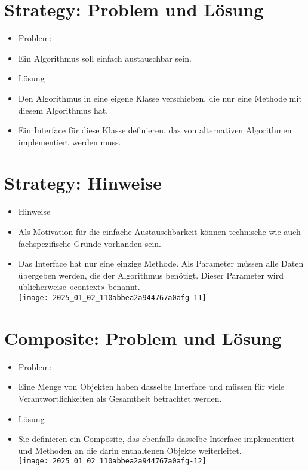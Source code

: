 \documentclass[10pt]{article}
\begin{document}
\section*{Strategy: Problem und Lösung}
\begin{itemize}
  \item Problem:
  \item Ein Algorithmus soll einfach austauschbar sein.
  \item Lösung
  \item Den Algorithmus in eine eigene Klasse verschieben, die nur eine Methode mit diesem Algorithmus hat.
  \item Ein Interface für diese Klasse definieren, das von alternativen Algorithmen implementiert werden muss.
\end{itemize}

\section*{Strategy: Hinweise}
\begin{itemize}
  \item Hinweise
  \item Als Motivation für die einfache Austauschbarkeit können technische wie auch fachspezifische Gründe vorhanden sein.
  \item Das Interface hat nur eine einzige Methode. Als Parameter müssen alle Daten übergeben werden, die der Algorithmus benötigt. Dieser Parameter wird üblicherweise «context» benannt.\\
\texttt{[image: 2025\_01\_02\_110abbea2a944767a0afg-11]}
\end{itemize}

\section*{Composite: Problem und Lösung}
\begin{itemize}
  \item Problem:
  \item Eine Menge von Objekten haben dasselbe Interface und müssen für viele Verantwortlichkeiten als Gesamtheit betrachtet werden.
  \item Lösung
  \item Sie definieren ein Composite, das ebenfalls dasselbe Interface implementiert und Methoden an die darin enthaltenen Objekte weiterleitet.\\
\texttt{[image: 2025\_01\_02\_110abbea2a944767a0afg-12]}
\end{itemize}
\end{document}

